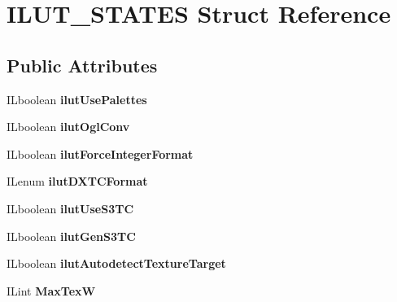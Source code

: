 \hypertarget{structILUT__STATES}{}\section{I\+L\+U\+T\+\_\+\+S\+T\+A\+T\+ES Struct Reference}
\label{structILUT__STATES}
\subsection*{Public Attributes}
\begin{DoxyCompactItemize}
\item 
\mbox{\label{structILUT__STATES_ab27a18ecf693b5d64098dcc2db34c93b}} 
I\+Lboolean {\bfseries ilut\+Use\+Palettes}
\item 
\mbox{\label{structILUT__STATES_a133cedd4da111d5eef1c85ea47079f3f}} 
I\+Lboolean {\bfseries ilut\+Ogl\+Conv}
\item 
\mbox{\label{structILUT__STATES_a9b25344f0498ec5f3ff21496179fd06c}} 
I\+Lboolean {\bfseries ilut\+Force\+Integer\+Format}
\item 
\mbox{\label{structILUT__STATES_abbcf63b321c246dd38f71d5bdfcb86eb}} 
I\+Lenum {\bfseries ilut\+D\+X\+T\+C\+Format}
\item 
\mbox{\label{structILUT__STATES_ab7850958638b92fcea9583d1c1b02b83}} 
I\+Lboolean {\bfseries ilut\+Use\+S3\+TC}
\item 
\mbox{\label{structILUT__STATES_a1b97d1371d90bb24a74cd3230b062886}} 
I\+Lboolean {\bfseries ilut\+Gen\+S3\+TC}
\item 
\mbox{\label{structILUT__STATES_aa0ebcd5610c70858d373259437858592}} 
I\+Lboolean {\bfseries ilut\+Autodetect\+Texture\+Target}
\item 
\mbox{\label{structILUT__STATES_a866613af07c921309e56dda6e9197b95}} 
I\+Lint {\bfseries Max\+TexW}
\item 
\mbox{\label{structILUT__STATES_a785a2c1b319c8b341cd38da0c188a721}} 

\end{DoxyCompactItemize}
